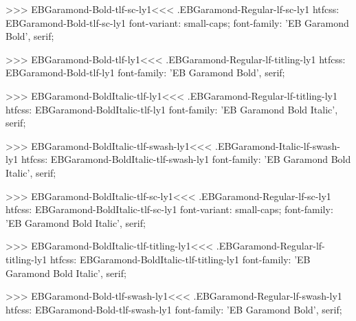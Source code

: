 {{>>>
\<EBGaramond-Bold-tlf-sc-ly1\><<<
.EBGaramond-Regular-lf-sc-ly1
htfcss:  EBGaramond-Bold-tlf-sc-ly1  font-variant: small-caps; font-family: 'EB Garamond Bold', serif;

>>>
\<EBGaramond-Bold-tlf-ly1\><<<
.EBGaramond-Regular-lf-titling-ly1
htfcss:  EBGaramond-Bold-tlf-ly1  font-family: 'EB Garamond Bold', serif;

>>>
\<EBGaramond-BoldItalic-tlf-ly1\><<<
.EBGaramond-Regular-lf-titling-ly1
htfcss:  EBGaramond-BoldItalic-tlf-ly1  font-family: 'EB Garamond Bold Italic', serif;

>>>
\<EBGaramond-BoldItalic-tlf-swash-ly1\><<<
.EBGaramond-Italic-lf-swash-ly1
htfcss:  EBGaramond-BoldItalic-tlf-swash-ly1  font-family: 'EB Garamond Bold Italic', serif;

>>>
\<EBGaramond-BoldItalic-tlf-sc-ly1\><<<
.EBGaramond-Regular-lf-sc-ly1
htfcss:  EBGaramond-BoldItalic-tlf-sc-ly1  font-variant: small-caps; font-family: 'EB Garamond Bold Italic', serif;

>>>
\<EBGaramond-BoldItalic-tlf-titling-ly1\><<<
.EBGaramond-Regular-lf-titling-ly1
htfcss:  EBGaramond-BoldItalic-tlf-titling-ly1  font-family: 'EB Garamond Bold Italic', serif;

>>>
\<EBGaramond-Bold-tlf-swash-ly1\><<<
.EBGaramond-Regular-lf-swash-ly1
htfcss:  EBGaramond-Bold-tlf-swash-ly1  font-family: 'EB Garamond Bold', serif;

}}
